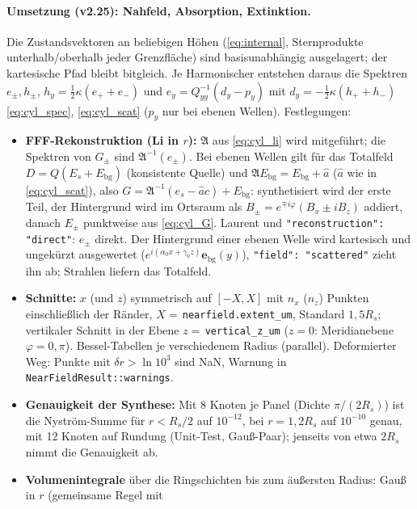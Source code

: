 \paragraph{Umsetzung (v2.25): Nahfeld, Absorption, Extinktion.}
Die Zustandsvektoren an beliebigen Höhen (\eqref{eq:internal}, Sternprodukte unterhalb/oberhalb jeder Grenzfläche) sind
basisunabhängig ausgelagert; der kartesische Pfad bleibt bitgleich. Je Harmonischer entstehen daraus die Spektren
$e_\pm,h_\pm$, $h_y=\tfrac12\kappa(e_++e_-)$ und $e_y=Q_{yy}^{-1}(d_y-p_y)$ mit $d_y=-\tfrac12\kappa(h_++h_-)$
\eqref{eq:cyl_spec}, \eqref{eq:cyl_scat} ($p_y$ nur bei ebenen Wellen). Festlegungen:
\begin{itemize}[nosep]
  \item \textbf{FFF-Rekonstruktion (Li in $r$):} $\mathfrak A$ aus \eqref{eq:cyl_li} wird mitgeführt; die Spektren von
        $G_\pm$ sind $\mathfrak A^{-1}(e_\pm)$. Bei ebenen Wellen gilt für das Totalfeld $D=Q(E_s+E_{\text{bg}})$ (konsistente
        Quelle) und $\mathfrak AE_{\text{bg}}=E_{\text{bg}}+\hat a$ ($\hat a$ wie in \eqref{eq:cyl_scat}), also
        $G=\mathfrak A^{-1}(e_s-\hat ac)+E_{\text{bg}}$: synthetisiert wird der erste Teil, der Hintergrund wird im Ortsraum
        als $B_\pm=e^{\mp i\varphi}(B_x\pm iB_z)$ addiert, danach $E_\pm$ punktweise aus \eqref{eq:cyl_G}. Laurent und
        \verb|"reconstruction": "direct"|: $e_\pm$ direkt. Der Hintergrund einer ebenen Welle wird kartesisch und
        ungekürzt ausgewertet ($e^{i(\alpha_0x+\gamma_0z)}\mathbf e_{\text{bg}}(y)$), \verb|"field": "scattered"| zieht ihn ab;
        Strahlen liefern das Totalfeld.
  \item \textbf{Schnitte:} $x$ (und $z$) symmetrisch auf $[-X,X]$ mit $n_x$ ($n_z$) Punkten einschließlich der Ränder,
        $X=$\,\verb|nearfield.extent_um|, Standard $1{,}5R_s$; vertikaler Schnitt in der Ebene $z=$\,\verb|vertical_z_um|
        ($z=0$: Meridianebene $\varphi=0,\pi$). Bessel-Tabellen je verschiedenem Radius (parallel). Deformierter Weg:
        Punkte mit $\delta r>\ln10^3$ sind NaN, Warnung in \verb|NearFieldResult::warnings|.
  \item \textbf{Genauigkeit der Synthese:} Mit 8 Knoten je Panel (Dichte $\pi/(2R_s)$) ist die Nyström-Summe für
        $r<R_s/2$ auf $10^{-12}$, bei $r=1{,}2R_s$ auf $10^{-10}$ genau, mit 12 Knoten auf Rundung (Unit-Test, Gauß-Paar);
        jenseits von etwa $2R_s$ nimmt die Genauigkeit ab.
  \item \textbf{Volumenintegrale} über die Ringschichten bis zum äußersten Radius: Gauß in $r$ (gemeinsame Regel mit

\end{itemize}
